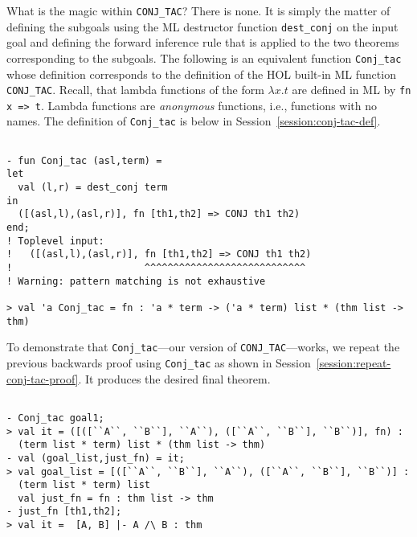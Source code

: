 What is the magic within \verb|CONJ_TAC|? There is none. It is simply
the matter of defining the subgoals using the ML destructor function
\verb|dest_conj| on the input goal and defining the forward inference
rule that is applied to the two theorems corresponding to the
subgoals.  The following is an equivalent function \verb|Conj_tac|
whose definition corresponds to the definition of the HOL built-in ML
function \verb|CONJ_TAC|. Recall, that lambda functions of the form
$\lambda x. t$ are defined in ML by \verb|fn x => t|. Lambda functions
are \emph{anonymous} functions, i.e., functions with no names. The
definition of \verb|Conj_tac| is below in
Session~\ref{session:conj-tac-def}.
\begin{session}
  \label{session:conj-tac-def}
  \begin{scriptsize}
\begin{verbatim}

- fun Conj_tac (asl,term) =
let
  val (l,r) = dest_conj term
in
  ([(asl,l),(asl,r)], fn [th1,th2] => CONJ th1 th2)
end;
! Toplevel input:
!   ([(asl,l),(asl,r)], fn [th1,th2] => CONJ th1 th2)
!                       ^^^^^^^^^^^^^^^^^^^^^^^^^^^^
! Warning: pattern matching is not exhaustive

> val 'a Conj_tac = fn : 'a * term -> ('a * term) list * (thm list -> thm)
\end{verbatim}
  \end{scriptsize}
\end{session}
To demonstrate that \verb|Conj_tac|---our version of
\verb|CONJ_TAC|---works, we repeat the previous backwards proof using
\verb|Conj_tac| as shown in
Session~\ref{session:repeat-conj-tac-proof}. It produces the desired
final theorem.
\begin{session}
  \label{session:repeat-conj-tac-proof}
  \begin{scriptsize}
\begin{verbatim}

- Conj_tac goal1;
> val it = ([([``A``, ``B``], ``A``), ([``A``, ``B``], ``B``)], fn) :
  (term list * term) list * (thm list -> thm)
- val (goal_list,just_fn) = it;
> val goal_list = [([``A``, ``B``], ``A``), ([``A``, ``B``], ``B``)] :
  (term list * term) list
  val just_fn = fn : thm list -> thm
- just_fn [th1,th2];
> val it =  [A, B] |- A /\ B : thm
\end{verbatim}
  \end{scriptsize}

\end{session}


